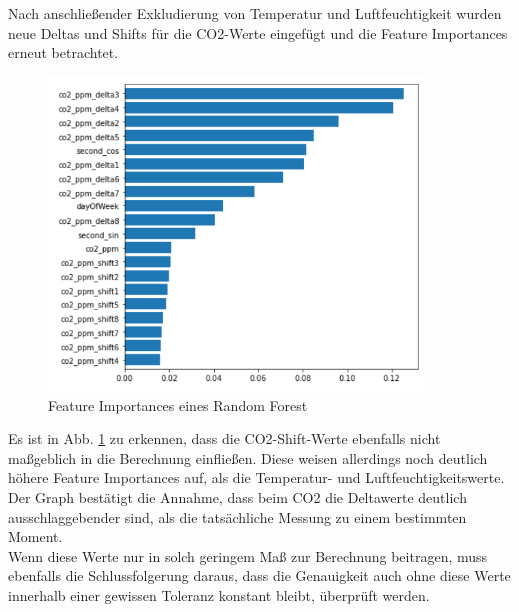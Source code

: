 \newpage

Nach anschließender Exkludierung von Temperatur und Luftfeuchtigkeit wurden neue Deltas und Shifts für die 
CO2-Werte eingefügt und die Feature Importances erneut betrachtet.

\begin{figure}[h]
    \centering
    \includegraphics[width=0.9\textwidth]{pic/feature_importances_better.png}
    \caption{Feature Importances eines Random Forest}
    \label{fig:FIB}
\end{figure}

Es ist in Abb. \ref{fig:FIB} zu erkennen, dass die CO2-Shift-Werte ebenfalls nicht maßgeblich in die Berechnung einfließen. Diese weisen
allerdings noch deutlich höhere Feature Importances auf, als die Temperatur- und Luftfeuchtigkeitswerte.\\
Der Graph bestätigt die Annahme, dass beim CO2 die Deltawerte deutlich ausschlaggebender sind, als die 
tatsächliche Messung zu einem bestimmten Moment. \\

\newpage
Wenn diese Werte nur in solch geringem Maß zur Berechnung beitragen, muss ebenfalls die Schlussfolgerung daraus, 
dass die Genauigkeit auch ohne diese Werte innerhalb einer gewissen Toleranz konstant bleibt, überprüft werden.

